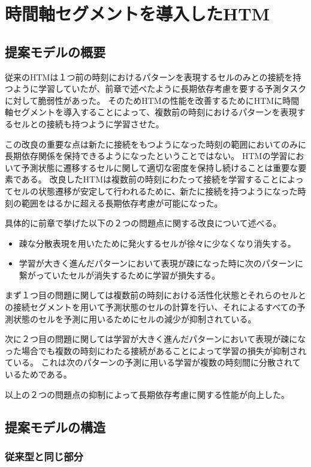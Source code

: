 \chapter{時間軸セグメントを導入したHTM}
\section{提案モデルの概要}
従来のHTMは１つ前の時刻におけるパターンを表現するセルのみとの接続を持つように学習していたが、前章で述べたように長期依存考慮を要する予測タスクに対して脆弱性があった。
そのためHTMの性能を改善するためにHTMに時間軸セグメントを導入することによって、複数前の時刻におけるパターンを表現するセルとの接続も持つように学習させた。

この改良の重要な点は新たに接続をもつようになった時刻の範囲においてのみに長期依存関係を保持できるようになったということではない。
HTMの学習において予測状態に遷移するセルに関して適切な密度を保持し続けることは重要な要素である。
改良したHTMは複数前の時刻にわたって接続を学習することによってセルの状態遷移が安定して行われるために、新たに接続を持つようになった時刻の範囲をはるかに超える長期依存考慮が可能になった。

具体的に前章で挙げた以下の２つの問題点に関する改良について述べる。

\begin{itemize}
  \item 疎な分散表現を用いたために発火するセルが徐々に少なくなり消失する。
  \item 学習が大きく進んだパターンにおいて表現が疎になった時に次のパターンに繋がっていたセルが消失するために学習が損失する。
\end{itemize}

まず１つ目の問題に関しては複数前の時刻における活性化状態とそれらのセルとの接続セグメントを用いて予測状態のセルの計算を行い、それによるすべての予測状態のセルを予測に用いるためにセルの減少が抑制されている。

次に２つ目の問題に関しては学習が大きく進んだパターンにおいて表現が疎になった場合でも複数の時刻にわたる接続があることによって学習の損失が抑制されている。
これは次のパターンの予測に用いる学習が複数の時刻間に分散されているためである。

以上の２つの問題点の抑制によって長期依存考慮に関する性能が向上した。

\section{提案モデルの構造}
\subsection{従来型と同じ部分}

